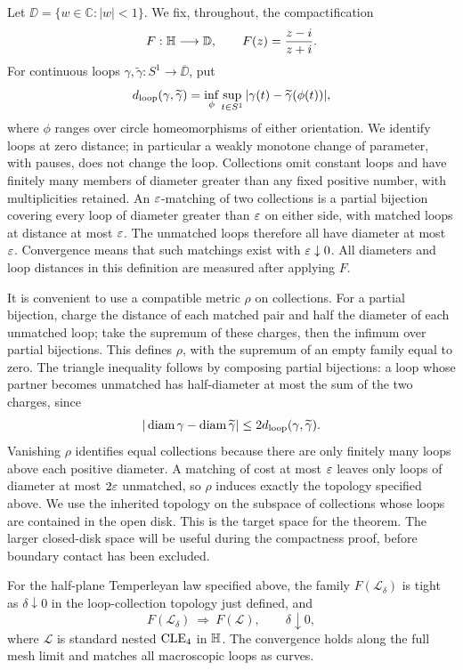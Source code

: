 Let \(\DD=\{w\in\mathbb C:|w|<1\}\). We fix, throughout, the compactification
\[
 F:\mathbb H\longrightarrow\mathbb D,\qquad F(z)=\frac{z-i}{z+i}.
\]
For continuous loops \(\gamma,\widetilde\gamma:S^1\to\overline{\DD}\), put
\[
 d_{\rm loop}(\gamma,\widetilde\gamma)
 =\inf_{\phi}\sup_{t\in S^1}
       |\gamma(t)-\widetilde\gamma(\phi(t))|,
\]
where \(\phi\) ranges over circle homeomorphisms of either orientation.
We identify loops at zero distance; in particular a weakly monotone change
of parameter, with pauses, does not change the loop.
Collections omit constant loops and have finitely many members of diameter
greater than any fixed positive number, with multiplicities retained.
An \(\varepsilon\)-matching of two
collections is a partial bijection covering every loop of diameter greater
than \(\varepsilon\) on either side, with matched loops at distance at most
\(\varepsilon\). The unmatched loops therefore all have diameter at most
\(\varepsilon\). Convergence means that such matchings exist with
\(\varepsilon\downarrow0\). All diameters and loop distances in this definition
are measured after applying \(F\).

It is convenient to use a compatible metric \(\rho\) on collections.
For a partial bijection, charge the distance of each matched pair and
half the diameter of each unmatched loop; take the supremum of these
charges, then the infimum over partial bijections.
This defines \(\rho\), with the supremum of an empty family equal to zero.
The triangle inequality follows by composing partial bijections: a loop
whose partner becomes unmatched has half-diameter at most the sum of
the two charges, since
\[
 |\operatorname{diam}\gamma-\operatorname{diam}\widetilde\gamma|
       \le 2d_{\rm loop}(\gamma,\widetilde\gamma).
\]
Vanishing \(\rho\) identifies equal collections because there are only
finitely many loops above each positive diameter. A matching of cost at
most \(\varepsilon\) leaves only loops of diameter at most \(2\varepsilon\) unmatched,
so \(\rho\) induces exactly the topology specified above.
We use the inherited topology on the subspace of collections whose loops
are contained in the open disk. This is the target space for the theorem.
The larger closed-disk space will be useful during the compactness proof,
before boundary contact has been excluded.

\begin{theorem}\label{thm:main}
For the half-plane Temperleyan law specified above, the family
\(F(\mathcal L_\delta)\) is tight as \(\delta\downarrow0\) in the
loop-collection topology just defined, and
\[
 F(\mathcal L_\delta)\ \Longrightarrow\ F(\mathcal L),
 \qquad \delta\downarrow0,
\]
where \(\mathcal L\) is standard nested \(\mathrm{CLE}_4\) in \(\mathbb H\).
The convergence holds along the full mesh limit and matches all
macroscopic loops as curves.
\end{theorem}

